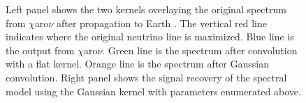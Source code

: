 \begin{figure}[h]
    \caption{Left panel shows the two kernels overlaying the original spectrum from $\chi$aro$\nu$ after propagation to Earth \cite{Charon}. The vertical red line indicates where the original neutrino line is maximized. Blue line is the output from $\chi$aro$\nu$. Green line is the spectrum after convolution with a flat kernel. Orange line is the spectrum after Gaussian convolution. Right panel shows the signal recovery of the spectral model using the Gaussian kernel with parameters enumerated above.} \label{fig:icDM_fixed_line}
\end{figure}

